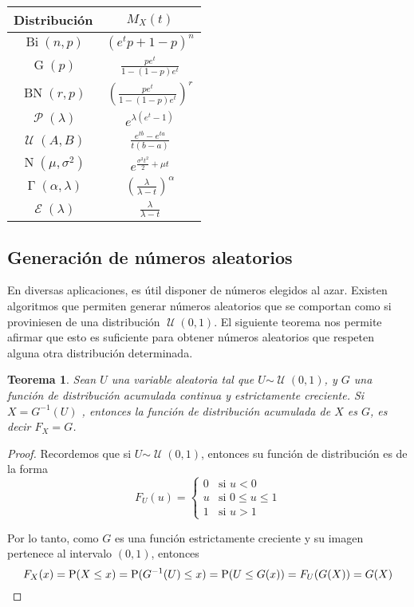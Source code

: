 \documentclass[11pt]{article}
\theoremstyle{plain}
\newtheorem*{teo}{Teorema}
\theoremstyle{definition}
\theoremstyle{remark}
\newcommand{\proba}{\ensuremath{\operatorname{P}}}  %
\newcommand{\dists}[1]{\ensuremath{\operatorname{#1}}}  %
\newcommand{\dist}[1]{\ensuremath{\sim \operatorname{#1}}}  %
\newcommand{\poisson}[0]{\ensuremath{\mathcal{P}}}  %
\newcommand{\unif}[0]{\ensuremath{\mathcal{U}}}  %
\newcommand{\exponen}[0]{\ensuremath{\mathcal{E}}}  %
\begin{document}
      \begin{center}
        \begin{tabular}{c | c}%
          Distribución                      & $\displaystyle M_X(t)$ \\ \hline
          $\dists{Bi}(n, p)$                & $\displaystyle \left( e^t p + 1 - p \right)^n$ \\
          $\dists{G}(p)$                    & $\displaystyle \frac{p e^t}{1 - (1 - p)e^t}$ \\
          $\dists{BN}(r,p)$                 & $\displaystyle \left( \frac{p e^t}{1 - (1 - p)e^t} \right)^r$ \\
          $\dists{\poisson}(\lambda)$       & $\displaystyle e^{\lambda(e^t - 1)}$ \\
          $\dists{\unif}(A,B)$                  & $\displaystyle \frac{e^{tb} - e^{ta}}{t(b - a)}$ \\
          $\dists{N}(\mu,\sigma^2)$         & $\displaystyle e^{\frac{\sigma^2 t^2}{2} + \mu t}$ \\
          $\dists{\Gamma}(\alpha,\lambda)$  & $\displaystyle \left( \frac{\lambda}{\lambda - t} \right)^\alpha$ \\
          $\dists{\exponen}(\lambda)$       & $\displaystyle \frac{\lambda}{\lambda - t}$
        \end{tabular}
      \end{center}

  \subsection{Generación de números aleatorios}
    En diversas aplicaciones, es útil disponer de números elegidos al azar. Existen algoritmos que permiten generar números aleatorios que se comportan como si proviniesen de una distribución $\dists{\unif}(0,1)$. El siguiente teorema nos permite afirmar que esto es suficiente para obtener números aleatorios que respeten alguna otra distribución determinada.

    \begin{teo}
      Sean $U$ una variable aleatoria tal que $U \dist{\unif}(0,1)$, y $G$ una función de distribución acumulada continua y estrictamente creciente. Si $X = G^{-1}(U)$ , entonces la función de distribución acumulada de $X$ es $G$, es decir $F_X = G$.
    \end{teo}
    \begin{proof}
      Recordemos que si $U \dist{\unif}(0,1)$, entonces su función de distribución es de la forma
      \[ F_U(u) = \begin{cases}
        0 & \text{si $u < 0$} \\
        \displaystyle u & \text{si $0 \leq u \leq 1$} \\
        1 & \text{si $u > 1$}
      \end{cases} \]

      Por lo tanto, como $G$ es una función estrictamente creciente y su imagen pertenece al intervalo $(0,1)$, entonces
      \[ F_X(x) = \proba(X \leq x) = \proba(G^{-1}(U) \leq x) = \proba(U \leq G(x)) = F_U(G(X)) = G(X) \qedhere \]
    \end{proof}
\end{document}
